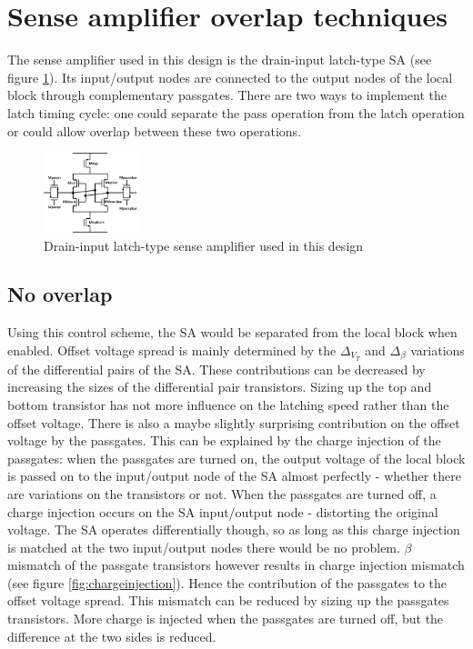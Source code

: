 \documentclass[journal]{IEEEtran}
\begin{document}
\section{Sense amplifier overlap techniques}
The sense amplifier used in this design is the drain-input latch-type SA (see figure \ref{fig:ourSA}). Its input/output nodes are connected to the output nodes of the local block through complementary passgates. There are two ways to implement the latch timing cycle: one could separate the pass operation from the latch operation or could allow overlap between these two operations.

\begin{figure}[ht!]
  \centering
  \includegraphics[width=0.25\textwidth]{../fig/hfdstk-sensamp-ourSA.png}
  \caption{Drain-input latch-type sense amplifier used in this design}
  \label{fig:ourSA}
\end{figure}


\subsection{No overlap}
Using this control scheme, the SA would be separated from the local block when enabled. Offset voltage spread is mainly determined by the $\Delta_{V_{T}}$ and $\Delta_{\beta}$ variations of the differential pairs of the SA. These contributions can be decreased by increasing the sizes of the differential pair transistors. Sizing up the top and bottom transistor has not more influence on the latching speed rather than the offset voltage. There is also a maybe slightly surprising contribution on the offset voltage by the passgates. This can be explained by the charge injection of the passgates: when the passgates are turned on, the output voltage of the local block is passed on to the input/output node of the SA almost perfectly - whether there are variations on the transistors or not. When the passgates are turned off, a charge injection occurs on the SA input/output node - distorting the original voltage. The SA operates differentially though, so as long as this charge injection is matched at the two input/output nodes there would be no problem. $\beta$ mismatch of the passgate transistors however results in charge injection mismatch (see figure \ref{fig:chargeinjection}). Hence the contribution of the passgates to the offset voltage spread. This mismatch can be reduced by sizing up the passgates transistors. More charge is injected when the passgates are turned off, but the difference at the two sides is reduced.
\end{document}
